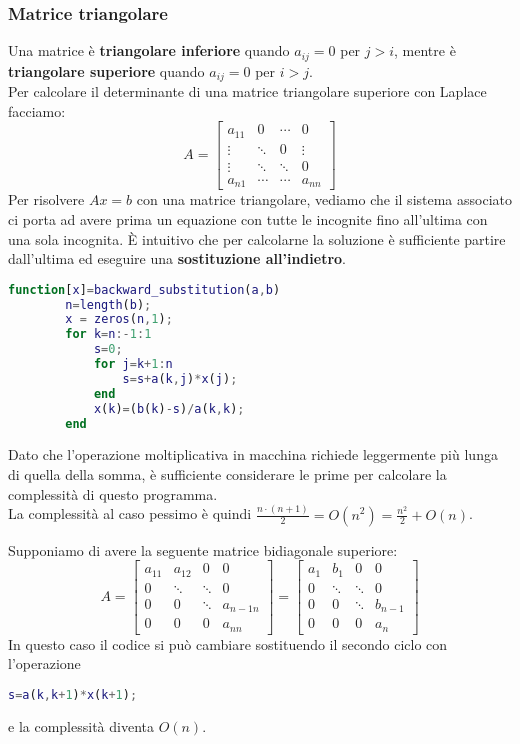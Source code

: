 \subsubsection{Matrice triangolare}
Una matrice è \textbf{triangolare inferiore} quando $a_{ij}=0$ per $j>i$, mentre è \textbf{triangolare superiore} quando $a_{ij}=0$ per $i>j$.\\
Per calcolare il determinante di una matrice triangolare superiore con Laplace facciamo:
\begin{equation*}
	A=\begin{bmatrix}
		a_{11} & 0 & \cdots & 0 \\
		\vdots & \ddots & 0 & \vdots \\
		\vdots & \ddots& \ddots & 0\\
		a_{n1} & \cdots &\cdots & a_{nn}
	\end{bmatrix}
\end{equation*}
Per risolvere $Ax=b$ con una matrice triangolare, vediamo che il sistema associato ci porta ad avere prima un equazione con tutte le incognite fino all'ultima con una sola incognita. È intuitivo che per calcolarne la soluzione è sufficiente partire dall'ultima ed eseguire una \textbf{sostituzione all'indietro}.
\begin{lstlisting}[language=Matlab]
	function[x]=backward_substitution(a,b)
		n=length(b);
		x = zeros(n,1);
		for k=n:-1:1
			s=0;
			for j=k+1:n
				s=s+a(k,j)*x(j);
			end
			x(k)=(b(k)-s)/a(k,k);
		end
\end{lstlisting}
Dato che l'operazione moltiplicativa in macchina richiede leggermente più lunga di quella della somma, è sufficiente considerare le prime per calcolare la complessità di questo programma.\\ La complessità al caso pessimo è quindi $\frac{n \cdot (n+1)}{2} = O(n^2) = \frac{n^2}{2}+O(n)$.
\begin{example}
	Supponiamo di avere la seguente matrice bidiagonale superiore:
	\begin{equation*}
		A=\begin{bmatrix}
			a_{11} & a_{12} & 0 & 0\\
			0 & \ddots & \ddots & 0 \\
			0 & 0 & \ddots & a_{n-1 n} \\
			0 & 0 & 0 & a_{nn}
		\end{bmatrix}  = 
		\begin{bmatrix}
			a_1 & b_1 & 0 & 0\\
			0 & \ddots & \ddots & 0\\
			0 & 0 & \ddots & b_{n-1}\\
			0 & 0 & 0 & a_n
		\end{bmatrix}
	\end{equation*}
	In questo caso il codice si può cambiare sostituendo il secondo ciclo con l'operazione
	\begin{lstlisting}[language=Matlab]
		s=a(k,k+1)*x(k+1);
	\end{lstlisting}
	e la complessità diventa $O(n)$.
\end{example}